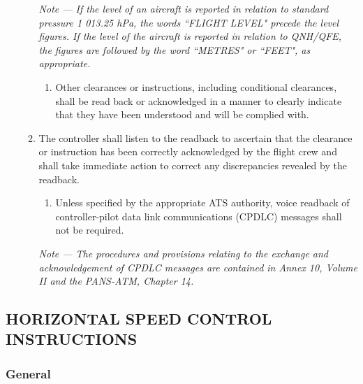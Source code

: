 \documentclass[../main.tex]{subfiles}
\begin{document}
\begin{enumerate}[itemsep=0.2cm]
\begin{enumerate}
            \textit{Note --- If the level of an aircraft is reported in relation to standard pressure 1 013.25 hPa, the words ``FLIGHT LEVEL" precede the level figures. If the level of the aircraft is reported in relation to QNH/QFE, the figures are followed by the word ``METRES" or ``FEET", as appropriate.}
            
            \begin{enumerate}
                \item Other clearances or instructions, including conditional clearances, shall be read back or acknowledged in a manner to clearly indicate that they have been understood and will be complied with.
            \end{enumerate}

            \item The controller shall listen to the readback to ascertain that the clearance or instruction has been correctly acknowledged by the flight crew and shall take immediate action to correct any discrepancies revealed by the readback.
            \begin{enumerate}
                \item Unless specified by the appropriate ATS authority, voice readback of controller-pilot data link communications (CPDLC) messages shall not be required.
            \end{enumerate}

            \textit{Note --- The procedures and provisions relating to the exchange and acknowledgement of CPDLC messages are contained in Annex 10, Volume II and the PANS-ATM, Chapter 14.}
        \end{enumerate}
    \end{enumerate}

    \subsection[Horizontal speed control instructions]{HORIZONTAL SPEED CONTROL INSTRUCTIONS}

    \subsubsection{General}
\end{document}
